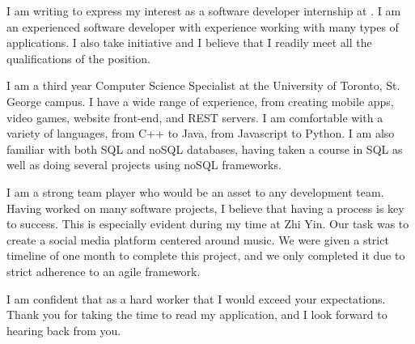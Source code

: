 \documentclass[11pt, a4paper]{awesome-cv} %
\begin{document}
\makecvheader %
\makelettertitle



\begin{cvletter}

I am writing to express my interest as a software developer internship at \position. I am an experienced software developer with experience working with many types of applications. I also take initiative and I believe that I readily meet all the qualifications of the position. 

I am a third year Computer Science Specialist at the University of Toronto, St. George campus. I have a wide range of experience, from creating mobile apps, video games, website front-end, and REST servers. I am comfortable with a variety of languages, from C++ to Java, from Javascript to Python. I am also familiar with both SQL and noSQL databases, having taken a course in SQL as well as doing several projects using noSQL frameworks.

I am a strong team player who would be an asset to any development team. Having worked on many software projects, I believe that having a process is key to success. This is especially evident during my time at Zhi Yin. Our task was to create a social media platform centered around music. We were given a strict timeline of one month to complete this project, and we only completed it due to strict adherence to an agile framework.

I am confident that as a hard worker that I would exceed your expectations. Thank you for taking the time to read my application, and I look forward to hearing back from you.


\end{cvletter}


\makeletterclosing %
\end{document}

